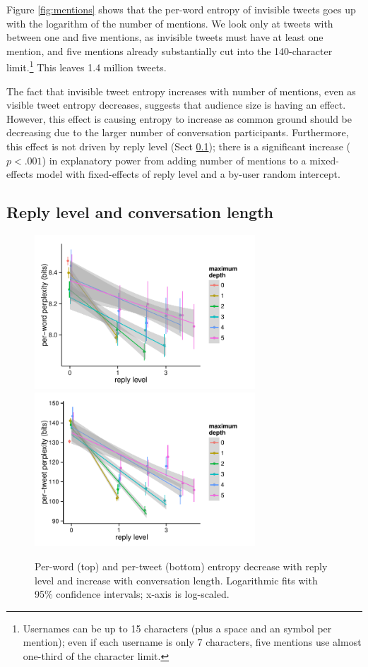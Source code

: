 \documentclass[11pt,letterpaper]{article}
\begin{document}
Figure \ref{fig:mentions} shows that the per-word entropy of invisible tweets goes up with the logarithm of the number of mentions.   We look only at tweets with between one and five mentions, as invisible tweets must have at least one mention, and five mentions already substantially cut into the 140-character limit.\footnote{Usernames can be up to 15 characters (plus a space and an \@ symbol per mention); even if each username is only 7 characters, five mentions use almost one-third of the character limit.}  This leaves 1.4 million tweets.

The fact that invisible tweet entropy increases with number of mentions, even as visible tweet entropy decreases, suggests that audience size is having an effect.  However, this effect is causing entropy to increase as common ground should be decreasing due to the larger number of conversation participants.  Furthermore, this effect is not driven by reply level (Sect \ref{sect:reply-level}); there is a significant increase ($p < .001$) in explanatory power from adding number of mentions to a mixed-effects model with fixed-effects of reply level and a by-user random intercept.

\subsection{Reply level and conversation length}\label{sect:reply-level}

\begin{figure}[t]
 \centering
  \includegraphics[width=3.25in]{figures/cmcl-rlevel-pw.pdf}\vspace*{-.3em}
  \includegraphics[width=3.25in]{figures/cmcl-rlevel-pt.pdf}\vspace*{-.3em}
 \caption{Per-word (top) and per-tweet (bottom) entropy decrease with reply level and increase with conversation length.  Logarithmic fits with 95\% confidence intervals; x-axis is log-scaled.}\label{fig:rlevel-maxdesc}\vspace*{-.5em}
\end{figure}
\end{document}
